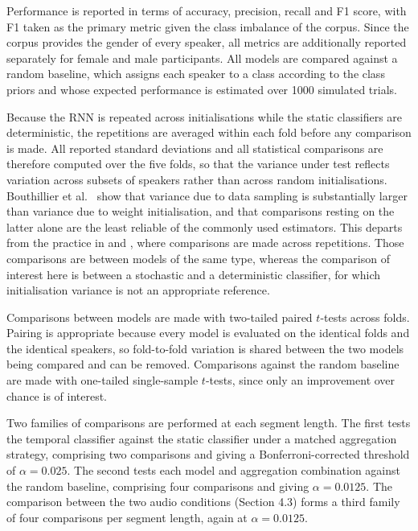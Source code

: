 \documentclass{mproj}
\begin{document}
Performance is reported in terms of accuracy, precision, recall and F1 score, with F1 taken as the primary metric given the class imbalance of the corpus. Since the corpus provides the gender of every speaker, all metrics are additionally reported separately for female and male participants. All models are compared against a random baseline, which assigns each speaker to a class according to the class priors and whose expected performance is estimated over 1000 simulated trials.

Because the RNN is repeated across initialisations while the static classifiers are deterministic, the repetitions are averaged within each fold before any comparison is made. All reported standard deviations and all statistical comparisons are therefore computed over the five folds, so that the variance under test reflects variation across subsets of speakers rather than across random initialisations. Bouthillier et al.\ \cite{bouthillier2021} show that variance due to data sampling is substantially larger than variance due to weight initialisation, and that comparisons resting on the latter alone are the least reliable of the commonly used estimators. This departs from the practice in \cite{alsofyani2021} and \cite{alsarrani2025}, where comparisons are made across repetitions. Those comparisons are between models of the same type, whereas the comparison of interest here is between a stochastic and a deterministic classifier, for which initialisation variance is not an appropriate reference.

Comparisons between models are made with two-tailed paired $t$-tests across folds. Pairing is appropriate because every model is evaluated on the identical folds and the identical speakers, so fold-to-fold variation is shared between the two models being compared and can be removed. Comparisons against the random baseline are made with one-tailed single-sample $t$-tests, since only an improvement over chance is of interest.

Two families of comparisons are performed at each segment length. The first tests the temporal classifier against the static classifier under a matched aggregation strategy, comprising two comparisons and giving a Bonferroni-corrected threshold of $\alpha = 0.025$. The second tests each model and aggregation combination against the random baseline, comprising four comparisons and giving $\alpha = 0.0125$. The comparison between the two audio conditions (Section 4.3) forms a third family of four comparisons per segment length, again at $\alpha = 0.0125$.
\end{document}
